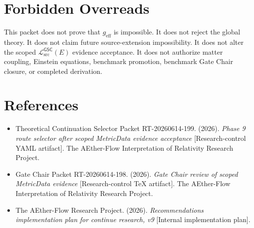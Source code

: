 \documentclass[11pt]{article}
\newcommand{\MetricData}{\mathcal{L}_{\mathrm{src}}^{\mathsf{GSC}}}
\newcommand{\geff}{g_{\mathrm{eff}}}
\begin{document}
\section{Forbidden Overreads}

This packet does not prove that \(\geff\) is impossible. It does not reject the
global theory. It does not claim future source-extension impossibility. It
does not alter the scoped \(\MetricData(E)\) evidence acceptance. It does not
authorize matter coupling, Einstein equations, benchmark promotion, benchmark
Gate Chair closure, or completed derivation.

\section{References}

\begin{itemize}[leftmargin=*]
  \item Theoretical Continuation Selector Packet RT-20260614-199. (2026).
  \emph{Phase 9 route selector after scoped MetricData evidence acceptance}
  [Research-control YAML artifact]. The AEther-Flow Interpretation of
  Relativity Research Project.
  \item Gate Chair Packet RT-20260614-198. (2026). \emph{Gate Chair review of
  scoped MetricData evidence} [Research-control TeX artifact]. The
  AEther-Flow Interpretation of Relativity Research Project.
  \item The AEther-Flow Research Project. (2026). \emph{Recommendations
  implementation plan for continue research, v9} [Internal implementation
  plan].
\end{itemize}
\end{document}
